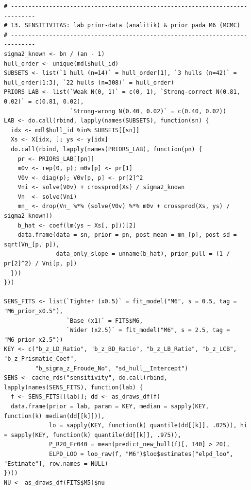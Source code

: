 \documentclass[
]{article}
\begin{document}
\begin{verbatim}
# -----------------------------------------------------------------------------
# 13. SENSITIVITAS: lab prior-data (analitik) & prior pada M6 (MCMC)
# -----------------------------------------------------------------------------
sigma2_known <- bn / (an - 1)
hull_order <- unique(mdl$hull_id)
SUBSETS <- list(`1 hull (n=14)` = hull_order[1], `3 hulls (n=42)` = hull_order[1:3], `22 hulls (n=308)` = hull_order)
PRIORS_LAB <- list(`Weak N(0, 1)` = c(0, 1), `Strong-correct N(0.81, 0.02)` = c(0.81, 0.02),
                   `Strong-wrong N(0.40, 0.02)` = c(0.40, 0.02))
LAB <- do.call(rbind, lapply(names(SUBSETS), function(sn) {
  idx <- mdl$hull_id %in% SUBSETS[[sn]]
  Xs <- X[idx, ]; ys <- y[idx]
  do.call(rbind, lapply(names(PRIORS_LAB), function(pn) {
    pr <- PRIORS_LAB[[pn]]
    m0v <- rep(0, p); m0v[p] <- pr[1]
    V0v <- diag(p); V0v[p, p] <- pr[2]^2
    Vni <- solve(V0v) + crossprod(Xs) / sigma2_known
    Vn_ <- solve(Vni)
    mn_ <- drop(Vn_ %*% (solve(V0v) %*% m0v + crossprod(Xs, ys) / sigma2_known))
    b_hat <- coef(lm(ys ~ Xs[, p]))[2]
    data.frame(data = sn, prior = pn, post_mean = mn_[p], post_sd = sqrt(Vn_[p, p]),
               data_only_slope = unname(b_hat), prior_pull = (1 / pr[2]^2) / Vni[p, p])
  }))
}))

SENS_FITS <- list(`Tighter (x0.5)` = fit_model("M6", s = 0.5, tag = "M6_prior_x0.5"),
                  `Base (x1)` = FITS$M6,
                  `Wider (x2.5)` = fit_model("M6", s = 2.5, tag = "M6_prior_x2.5"))
KEY <- c("b_z_LD_Ratio", "b_z_BD_Ratio", "b_z_LB_Ratio", "b_z_LCB", "b_z_Prismatic_Coef",
         "b_sigma_z_Froude_No", "sd_hull__Intercept")
SENS <- cache_rds("sensitivity", do.call(rbind, lapply(names(SENS_FITS), function(lab) {
  f <- SENS_FITS[[lab]]; dd <- as_draws_df(f)
  data.frame(prior = lab, param = KEY, median = sapply(KEY, function(k) median(dd[[k]])),
             lo = sapply(KEY, function(k) quantile(dd[[k]], .025)), hi = sapply(KEY, function(k) quantile(dd[[k]], .975)),
             P_R20_Fr040 = mean(predict_new_hull(f)[, I40] > 20),
             ELPD_LOO = loo_raw(f, "M6")$loo$estimates["elpd_loo", "Estimate"], row.names = NULL)
})))
NU <- as_draws_df(FITS$M5)$nu


\end{verbatim}
\end{document}
